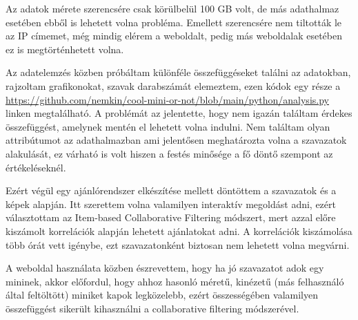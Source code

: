 \documentclass[14pt,a4paper]{article}
\begin{document}
Az adatok mérete szerencsére csak körülbelül 100 GB volt, de más adathalmaz esetében ebből is lehetett volna probléma.
Emellett szerencsére nem tiltották le az IP címemet, még mindig elérem a weboldalt, pedig más weboldalak esetében
ez is megtörténhetett volna.

Az adatelemzés közben próbáltam különféle összefüggéseket találni az adatokban, rajzoltam grafikonokat, szavak
darabszámát elemeztem, ezen kódok egy része a
\href{https://github.com/nemkin/cool-mini-or-not/blob/main/python/analysis.py}{\url{https://github.com/nemkin/cool-mini-or-not/blob/main/python/analysis.py}}
linken megtalálható. A problémát az jelentette, hogy nem igazán találtam érdekes összefüggést, amelynek mentén el
lehetett volna indulni. Nem találtam olyan attribútumot az adathalmazban ami jelentősen meghatározta volna
a szavazatok alakulását, ez várható is volt hiszen a festés minősége a fő döntő szempont az értékeléseknél.

Ezért végül egy ajánlórendszer elkészítése mellett döntöttem a szavazatok és a képek alapján. Itt szerettem volna
valamilyen interaktív megoldást adni, ezért választottam az Item-based Collaborative Filtering módszert, mert azzal
előre kiszámolt korrelációk alapján lehetett ajánlatokat adni. A korrelációk kiszámolása több órát vett igénybe,
ezt szavazatonként biztosan nem lehetett volna megvárni.

A weboldal használata közben észrevettem, hogy ha jó szavazatot adok egy mininek, akkor előfordul, hogy ahhoz hasonló
méretű, kinézetű (más felhasználó által feltöltött) miniket kapok legközelebb, ezért összességében valamilyen
összefüggést sikerült kihasználni a collaborative filtering módszerével.



\end{document}
